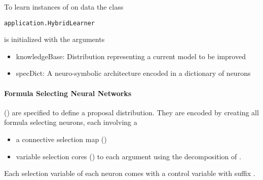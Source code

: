 %


To learn instances of  on data the class
\begin{lstlisting}
application.HybridLearner
\end{lstlisting}
is initialized with the arguments
\begin{itemize}
    \item knowledgeBase: Distribution representing a current model to be improved
    \item specDict: A neuro-symbolic architecture encoded in a dictionary of neurons
\end{itemize}

\paragraph{Formula Selecting Neural Networks} ()
are specified to define a proposal distribution.
They are encoded by creating all formula selecting neurons, each involving a
\begin{itemize}
    \item a connective selection map ()
    \item variable selection cores () to each argument using the decomposition of .
\end{itemize}
Each selection variable of each neuron comes with a control variable with suffix .

